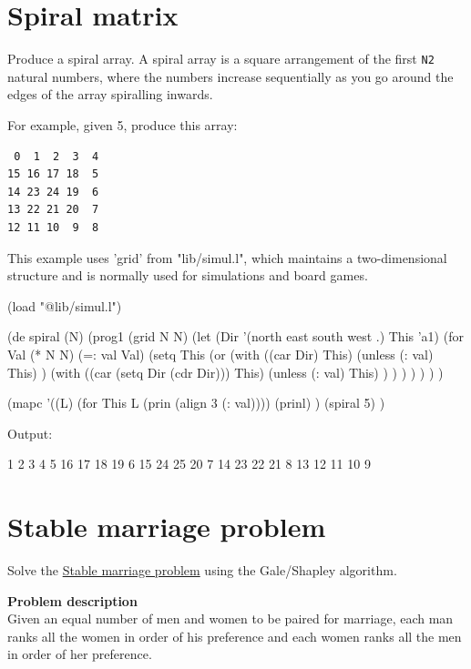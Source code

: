 \begin{itemize}
\begin{wideverbatim}
\end{wideverbatim}

\pagebreak{}
\section*{Spiral matrix}

Produce a spiral array. A spiral array is a square arrangement of the
first \texttt{N2} natural numbers, where the numbers increase
sequentially as you go around the edges of the array spiralling inwards.

For example, given 5, produce this array:

\begin{verbatim}
 0  1  2  3  4
15 16 17 18  5
14 23 24 19  6
13 22 21 20  7
12 11 10  9  8
\end{verbatim}


\begin{wideverbatim}

This example uses 'grid' from "lib/simul.l", which maintains a two-dimensional
structure and is normally used for simulations and board games.

(load "@lib/simul.l")

(de spiral (N)
   (prog1 (grid N N)
      (let (Dir '(north east south west .)  This 'a1)
         (for Val (* N N)
            (=: val Val)
            (setq This
               (or
                  (with ((car Dir) This)
                     (unless (: val) This) )
                  (with ((car (setq Dir (cdr Dir))) This)
                     (unless (: val) This) ) ) ) ) ) ) )

(mapc
   '((L)
      (for This L (prin (align 3 (: val))))
      (prinl) )
   (spiral 5) )

Output:

  1  2  3  4  5
 16 17 18 19  6
 15 24 25 20  7
 14 23 22 21  8
 13 12 11 10  9

\end{wideverbatim}

\pagebreak{}
\section*{Stable marriage problem}


Solve the
\href{http://en.wikipedia.org/wiki/Stable\_marriage\_problem}{Stable
  marriage problem} using the Gale/Shapley algorithm.

\textbf{Problem description}\\ Given an equal number of men and women to
be paired for marriage, each man ranks all the women in order of his
preference and each women ranks all the men in order of her preference.


\end{itemize}
